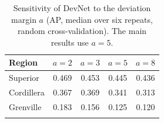 \documentclass[pdflatex,sn-apa]{sn-jnl}
\begin{document}
\begin{appendices}
\begin{table}[!h]
\caption{Sensitivity of DevNet to the deviation margin $a$ (AP, median over six repeats, random cross-validation). The main results use $a = 5$.}\label{tab:margin}
\footnotesize
\begin{tabular*}{0.7\textwidth}{@{\extracolsep\fill}lcccc}
\toprule
Region & $a = 2$ & $a = 3$ & $a = 5$ & $a = 8$ \\
\midrule
Superior & 0.469 & 0.453 & 0.445 & 0.436 \\
Cordillera & 0.367 & 0.369 & 0.341 & 0.313 \\
Grenville & 0.183 & 0.156 & 0.125 & 0.120 \\
\botrule
\end{tabular*}
\end{table}

\end{appendices}

\clearpage


\end{document}
